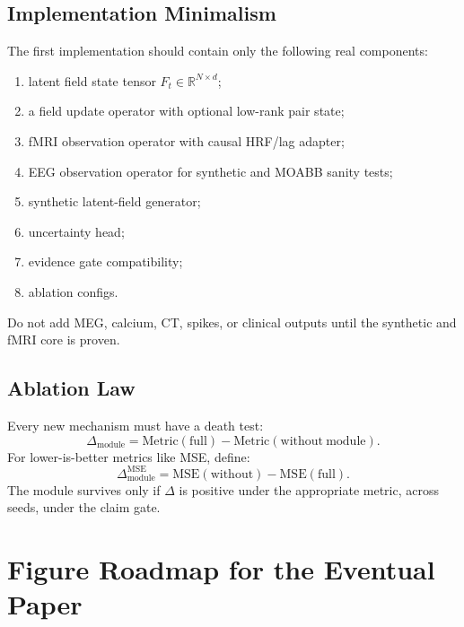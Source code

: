 \documentclass[11pt]{article}
\newcommand{\R}{\mathbb{R}}
\begin{document}
\subsection{Implementation Minimalism}
The first implementation should contain only the following real components:
\begin{enumerate}
\item latent field state tensor $F_{t}\in\R^{N\times d}$;
\item a field update operator with optional low-rank pair state;
\item fMRI observation operator with causal HRF/lag adapter;
\item EEG observation operator for synthetic and MOABB sanity tests;
\item synthetic latent-field generator;
\item uncertainty head;
\item evidence gate compatibility;
\item ablation configs.
\end{enumerate}
Do not add MEG, calcium, CT, spikes, or clinical outputs until the synthetic and fMRI core is proven.

\subsection{Ablation Law}
Every new mechanism must have a death test:
\begin{equation}
\Delta_{\mathrm{module}} = \mathrm{Metric}(\mathrm{full}) - \mathrm{Metric}(\mathrm{without\ module}).
\end{equation}
For lower-is-better metrics like MSE, define:
\begin{equation}
\Delta^{\mathrm{MSE}}_{\mathrm{module}} = \mathrm{MSE}(\mathrm{without}) - \mathrm{MSE}(\mathrm{full}).
\end{equation}
The module survives only if $\Delta$ is positive under the appropriate metric, across seeds, under the claim gate.

\section{Figure Roadmap for the Eventual Paper}
\end{document}
